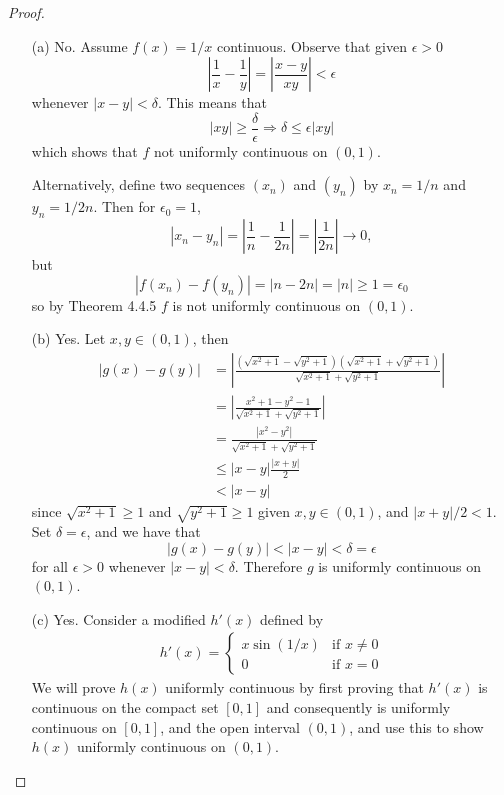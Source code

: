 \documentclass[11pt,twoside, reqno]{amsart}
\theoremstyle{remark}
\renewcommand{\implies}{\Rightarrow}
\begin{document}
\begin{proof}
\begin{enumerate}
    \item [(a)] No. Assume $f(x) = 1/x$ continuous. Observe that given $\epsilon > 0$
    $$
        |\frac{1}{x} - \frac{1}{y}| = |\frac{x - y}{xy}| < \epsilon
    $$
    whenever $|x - y| < \delta$. This means that
    $$
        |xy| \geq \frac{\delta}{\epsilon} \implies \delta \leq \epsilon |xy|
    $$
    which shows that $f$ not uniformly continuous on $(0,1)$.
    
    Alternatively, define two sequences $(x_n)$ and $(y_n)$ by $x_n = 1/n$ and $y_n = 1/2n$. Then for $\epsilon_0 = 1$,
    $$
        |x_n - y_n| = |\frac{1}{n} - \frac{1}{2n}| = |\frac{1}{2n}| \to 0,
    $$
    but
    $$
        |f(x_n) - f(y_n)| = |n - 2n| = |n| \geq 1 = \epsilon_0
    $$
    so by Theorem 4.4.5 $f$ is not uniformly continuous on $(0,1)$.
    \item [(b)] Yes. Let $x,y \in (0,1)$, then
    \begin{align*}
        |g(x) - g(y)| &= |\frac{(\sqrt{x^2 + 1} - \sqrt{y^2 + 1})(\sqrt{x^2 + 1} + \sqrt{y^2 + 1})}{\sqrt{x^2 + 1} + \sqrt{y^2 + 1}}| \\
        &= |\frac{x^2 + 1 - y^2 - 1}{\sqrt{x^2 + 1} + \sqrt{y^2 + 1}}| \\
        &= \frac{|x^2 - y^2|}{\sqrt{x^2 + 1} + \sqrt{y^2 + 1}} \\
        &\leq |x - y|\frac{|x + y|}{2} \\
        &< |x - y|
    \end{align*}
    since $\sqrt{x^2 + 1} \geq 1$ and $\sqrt{y^2 + 1} \geq 1$ given $x, y \in (0,1)$, and $|x + y| / 2 < 1$. Set $\delta = \epsilon$, and we have that
    $$
        |g(x) - g(y)| < |x - y| < \delta = \epsilon
    $$
    for all $\epsilon > 0$ whenever $|x - y| < \delta$. Therefore $g$ is uniformly continuous on $(0,1)$.
    \item [(c)] Yes. Consider a modified $h'(x)$ defined by
    \begin{align*}
        h'(x) = 
            \begin{cases}
                x\sin(1/x) & \text{if $x \neq 0$} \\
                0 & \text{if $x = 0$}
            \end{cases}
    \end{align*}
    We will prove $h(x)$ uniformly continuous by first proving that $h'(x)$ is continuous on the compact set $[0,1]$ and consequently is uniformly continuous on $[0,1]$, and the open interval $(0,1)$, and use this to show $h(x)$ uniformly continuous on $(0,1)$.
    

\end{enumerate}
\end{proof}
\end{document}
